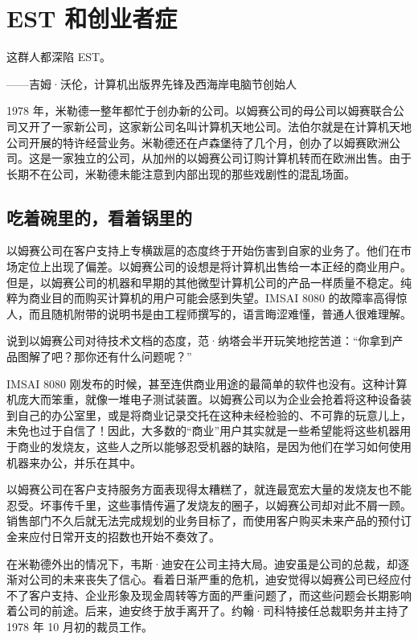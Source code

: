 \documentclass[12pt,UTF8]{ctexbook}
\begin{document}
\section{EST 和创业者症}


这群人都深陷 EST。

——吉姆·沃伦，计算机出版界先锋及西海岸电脑节创始人



1978 年，米勒德一整年都忙于创办新的公司。以姆赛公司的母公司以姆赛联合公司又开了一家新公司，这家新公司名叫计算机天地公司。法伯尔就是在计算机天地公司开展的特许经营业务。米勒德还在卢森堡待了几个月，创办了以姆赛欧洲公司。这是一家独立的公司，从加州的以姆赛公司订购计算机转而在欧洲出售。由于长期不在公司，米勒德未能注意到内部出现的那些戏剧性的混乱场面。





\subsection{吃着碗里的，看着锅里的}


以姆赛公司在客户支持上专横跋扈的态度终于开始伤害到自家的业务了。他们在市场定位上出现了偏差。以姆赛公司的设想是将计算机出售给一本正经的商业用户。但是，以姆赛公司的机器和早期的其他微型计算机公司的产品一样质量不稳定。纯粹为商业目的而购买计算机的用户可能会感到失望。IMSAI 8080 的故障率高得惊人，而且随机附带的说明书是由工程师撰写的，语言晦涩难懂，普通人很难理解。

说到以姆赛公司对待技术文档的态度，范·纳塔会半开玩笑地挖苦道：“你拿到产品图解了吧？那你还有什么问题呢？”

IMSAI 8080 刚发布的时候，甚至连供商业用途的最简单的软件也没有。这种计算机庞大而笨重，就像一堆电子测试装置。以姆赛公司以为企业会抢着将这种设备装到自己的办公室里，或是将商业记录交托在这种未经检验的、不可靠的玩意儿上，未免也过于自信了！因此，大多数的“商业”用户其实就是一些希望能将这些机器用于商业的发烧友，这些人之所以能够忍受机器的缺陷，是因为他们在学习如何使用机器来办公，并乐在其中。

以姆赛公司在客户支持服务方面表现得太糟糕了，就连最宽宏大量的发烧友也不能忍受。坏事传千里，这些事情传遍了发烧友的圈子，以姆赛公司却对此不屑一顾。销售部门不久后就无法完成规划的业务目标了，而使用客户购买未来产品的预付订金来应付日常开支的招数也开始不奏效了。

在米勒德外出的情况下，韦斯·迪安在公司主持大局。迪安虽是公司的总裁，却逐渐对公司的未来丧失了信心。看着日渐严重的危机，迪安觉得以姆赛公司已经应付不了客户支持、企业形象及现金周转等方面的严重问题了，而这些问题会长期影响着公司的前途。后来，迪安终于放手离开了。约翰·司科特接任总裁职务并主持了 1978 年 10 月初的裁员工作。
\end{document}
